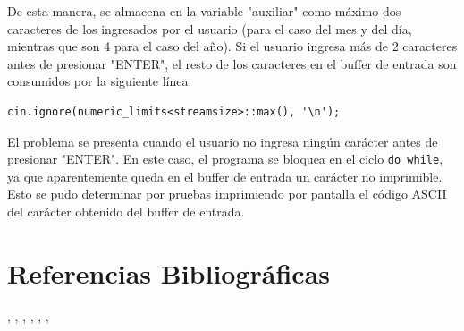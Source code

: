 \documentclass[a4paper,12pt]{article}
\begin{document}
De esta manera, se almacena en la variable "auxiliar" como máximo dos caracteres de los ingresados por el usuario (para el caso del mes y del día, mientras que son 4 para el caso del año). Si el usuario ingresa más de 2 caracteres antes de presionar "ENTER", el resto de los caracteres en el buffer de entrada son consumidos por la siguiente línea:
\begin{verbatim}
cin.ignore(numeric_limits<streamsize>::max(), '\n');
\end{verbatim}
El problema se presenta cuando el usuario no ingresa ningún carácter antes de presionar "ENTER". En este caso, el programa se bloquea en el ciclo \texttt{do{} while}, ya que aparentemente queda en el buffer de entrada un carácter no imprimible. Esto se pudo determinar por pruebas imprimiendo por pantalla el código ASCII del carácter obtenido del buffer de entrada.

\section{Referencias Bibliográficas}
\cite{cplusplus-setw}, \cite{geeksforgeeks-setw}, \cite{geeksforgeeks-input-buffer}, \cite{cplusplus-stoi}, \cite{geeksforgeeks-stoi}, \cite{stackoverflow-cin-get}, \cite{geeksforgeeks-cin-get}

\printbibliography[title={Referencias}]
\end{document}
